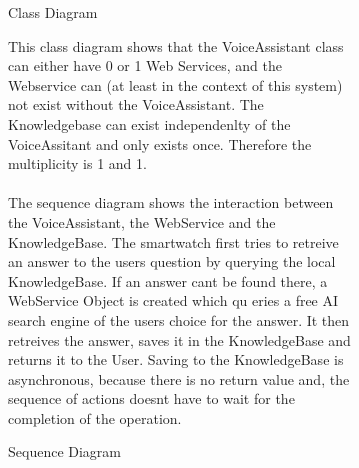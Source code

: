 \documentclass{article}
\begin{document}
		\begin{figure}[htbp]
			\centering
			\begin{subfigure}{\textwidth}
				\centering
				\resizebox{\textwidth}{!}{}
				\caption{Class Diagram}
			\end{subfigure}
			\begin{subfigure}{\textwidth}
				\vspace{1em}
				This class diagram shows that the VoiceAssistant class can either have 0 or 1 Web Services, and the Webservice can (at least in the context of this system)
				not exist without the VoiceAssistant. The Knowledgebase can exist independenlty of the VoiceAssitant and only exists once. Therefore the multiplicity is 1 and 1.
				\\ \\
				The sequence diagram shows the interaction between the VoiceAssistant, the WebService and the KnowledgeBase. 
				The smartwatch first tries to retreive an answer to the users question by querying the local KnowledgeBase.
				If an answer cant be found there, a WebService Object is created which qu eries a free AI search engine of the users choice for the answer.
				It then retreives the answer, saves it in the KnowledgeBase and returns it to the User. Saving to the KnowledgeBase is asynchronous,
				because there is no return value and, the sequence of actions doesnt have to wait for the completion of the operation.
			\end{subfigure}
		\end{figure}
		\clearpage
		
		\begin{figure}[htbp]
			\centering
			\begin{subfigure}{\textwidth}
				\centering
				
				\caption{Sequence Diagram}
			\end{subfigure}
			\begin{subfigure}{\textwidth}
			
			\end{subfigure}
		\end{figure} 
		\clearpage
\end{document}
